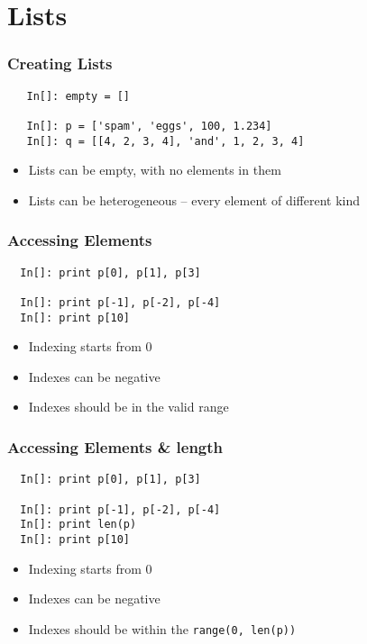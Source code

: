 \section{Lists}

\begin{frame}[fragile]
  \frametitle{Creating Lists}
  \begin{lstlisting}
   In[]: empty = [] 

   In[]: p = ['spam', 'eggs', 100, 1.234]
   In[]: q = [[4, 2, 3, 4], 'and', 1, 2, 3, 4]
  \end{lstlisting}
  \begin{itemize}
  \item Lists can be empty, with no elements in them
  \item Lists can be heterogeneous -- every element of different kind
  \end{itemize}
\end{frame}

\begin{frame}[fragile]
  \frametitle{Accessing Elements}
  \begin{lstlisting}
  In[]: print p[0], p[1], p[3]

  In[]: print p[-1], p[-2], p[-4]
  In[]: print p[10]
  \end{lstlisting}
  \begin{itemize}
  \item Indexing starts from 0
  \item Indexes can be negative
  \item Indexes should be in the valid range
  \end{itemize}
\end{frame}

\begin{frame}[fragile]
  \frametitle{Accessing Elements \& length}
  \begin{lstlisting}
  In[]: print p[0], p[1], p[3]

  In[]: print p[-1], p[-2], p[-4]
  In[]: print len(p)
  In[]: print p[10]
  \end{lstlisting}
  \begin{itemize}
  \item Indexing starts from 0
  \item Indexes can be negative
  \item Indexes should be within the \texttt{range(0, len(p))}
  \end{itemize}
\end{frame}


